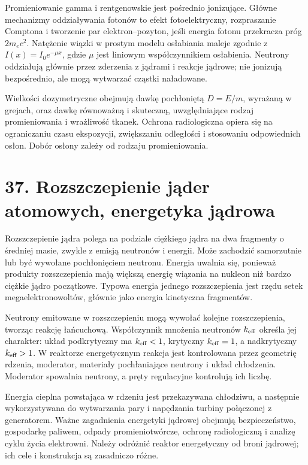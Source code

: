 \documentclass[11pt,a4paper,oneside]{report}
\begin{document}
Promieniowanie gamma i rentgenowskie jest pośrednio jonizujące. Główne mechanizmy oddziaływania fotonów to efekt fotoelektryczny, rozpraszanie Comptona i tworzenie par elektron–pozyton, jeśli energia fotonu przekracza próg \(2m_ec^2\). Natężenie wiązki w prostym modelu osłabiania maleje zgodnie z \(I(x)=I_0e^{-\mu x}\), gdzie \(\mu\) jest liniowym współczynnikiem osłabienia. Neutrony oddziałują głównie przez zderzenia z jądrami i reakcje jądrowe; nie jonizują bezpośrednio, ale mogą wytwarzać cząstki naładowane.

Wielkości dozymetryczne obejmują dawkę pochłoniętą \(D=E/m\), wyrażaną w grejach, oraz dawkę równoważną i skuteczną, uwzględniające rodzaj promieniowania i wrażliwość tkanek. Ochrona radiologiczna opiera się na ograniczaniu czasu ekspozycji, zwiększaniu odległości i stosowaniu odpowiednich osłon. Dobór osłony zależy od rodzaju promieniowania.

\section{37. Rozszczepienie jąder atomowych, energetyka jądrowa}
Rozszczepienie jądra polega na podziale ciężkiego jądra na dwa fragmenty o średniej masie, zwykle z emisją neutronów i energii. Może zachodzić samorzutnie lub być wywołane pochłonięciem neutronu. Energia uwalnia się, ponieważ produkty rozszczepienia mają większą energię wiązania na nukleon niż bardzo ciężkie jądro początkowe. Typowa energia jednego rozszczepienia jest rzędu setek megaelektronowoltów, głównie jako energia kinetyczna fragmentów.

Neutrony emitowane w rozszczepieniu mogą wywołać kolejne rozszczepienia, tworząc reakcję łańcuchową. Współczynnik mnożenia neutronów \(k_{\rm eff}\) określa jej charakter: układ podkrytyczny ma \(k_{\rm eff}<1\), krytyczny \(k_{\rm eff}=1\), a nadkrytyczny \(k_{\rm eff}>1\). W reaktorze energetycznym reakcja jest kontrolowana przez geometrię rdzenia, moderator, materiały pochłaniające neutrony i układ chłodzenia. Moderator spowalnia neutrony, a pręty regulacyjne kontrolują ich liczbę.

Energia cieplna powstająca w rdzeniu jest przekazywana chłodziwu, a następnie wykorzystywana do wytwarzania pary i napędzania turbiny połączonej z generatorem. Ważne zagadnienia energetyki jądrowej obejmują bezpieczeństwo, gospodarkę paliwem, odpady promieniotwórcze, ochronę radiologiczną i analizę cyklu życia elektrowni. Należy odróżnić reaktor energetyczny od broni jądrowej; ich cele i konstrukcja są zasadniczo różne.
\end{document}
